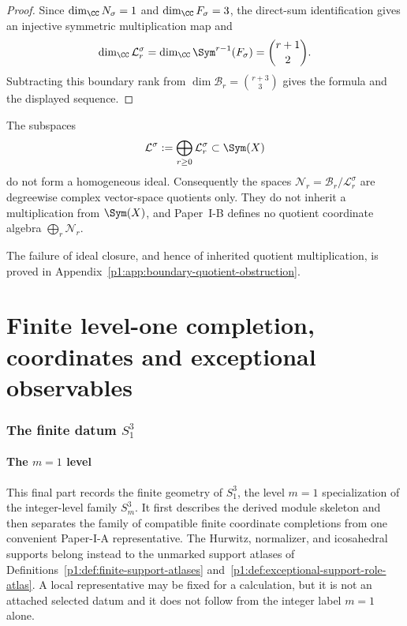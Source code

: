 \documentclass[11pt]{article}
\begin{document}
\begin{proof}
Since \(\dim_\CC N_\sigma=1\) and \(\dim_\CC F_\sigma=3\), the direct-sum identification gives an injective symmetric multiplication map and
\[
  \dim_\CC\mathcal L_r^\sigma
  =\dim_\CC\Sym^{r-1}(F_\sigma)
  =\binom{r+1}{2}.
\]
Subtracting this boundary rank from
\(\dim\mathcal B_r=\binom{r+3}{3}\) gives the formula and the displayed
sequence.
\end{proof}

\begin{proposition}
\label{p1:prop:boundary-quotient-not-algebra}
The subspaces
\[
    \mathcal L^\sigma:=\bigoplus_{r\ge0}\mathcal L_r^\sigma
    \subset\Sym(X)
\]
do not form a homogeneous ideal.  Consequently the spaces
\(\mathcal N_r=\mathcal B_r/\mathcal L_r^\sigma\) are degreewise complex
vector-space quotients only.  They do not inherit a multiplication from
\(\Sym(X)\), and Paper~I-B defines no quotient coordinate algebra
\(\bigoplus_r\mathcal N_r\).
\end{proposition}

\noindent
The failure of ideal closure, and hence of inherited quotient
multiplication, is proved in
Appendix~\ref{p1:app:boundary-quotient-obstruction}.

\clearpage
\part{Finite level-one completion, coordinates and exceptional observables}
\label{p1:part:m1-finite-geometry}

\section{The finite datum \texorpdfstring{\(S^3_1\)}{S³}}
\label{p1:sec:s3one-finite-datum}

\subsection{The \texorpdfstring{\(m=1\)}{m=1} level}
\label{p1:subsec:s3one-level}

This final part records the finite geometry of \(S^3_1\), the level \(m=1\)
specialization of the integer-level family \(S^3_m\).  It first describes the
derived module skeleton and then separates the family of compatible finite
coordinate completions from one convenient Paper-I-A representative.  The
Hurwitz, normalizer, and icosahedral supports belong instead to the unmarked
support atlases of Definitions~\ref{p1:def:finite-support-atlases}
and~\ref{p1:def:exceptional-support-role-atlas}.  A local representative may
be fixed for a calculation, but it is not an attached selected datum and it
does not follow from the integer label \(m=1\) alone.
\end{document}
